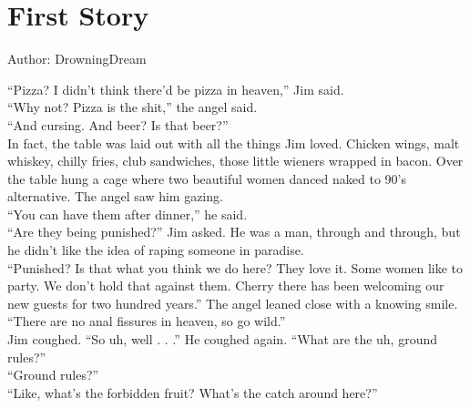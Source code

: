 \chapter{First Story}

Author: DrowningDream

\enquote{Pizza?  I didn't think there'd be pizza in heaven,} Jim said.\\

\enquote{Why not?  Pizza is the shit,} the angel said.\\



\enquote{And cursing.  And beer?  Is that beer?}\\



In fact, the table was laid out with all the things Jim loved.  Chicken wings, malt whiskey, chilly fries, club sandwiches, those little wieners wrapped in bacon.  Over the table hung a cage where two beautiful women danced naked to 90's alternative.  The angel saw him gazing.\\



\enquote{You can have them after dinner,} he said.  \\



\enquote{Are they being punished?} Jim asked.  He was a man, through and through, but he didn't like the idea of raping someone in paradise.\\



\enquote{Punished?  Is that what you think we do here?  They love it.  Some women like to party.  We don't hold that against them.  Cherry there has been welcoming our new guests for two hundred years.}  The angel leaned close with a knowing smile.  \enquote{There are no anal fissures in heaven, so go wild.}\\



Jim coughed.  \enquote{So uh, well . . .}  He coughed again.  \enquote{What are the uh, ground rules?}\\



\enquote{Ground rules?}\\



\enquote{Like, what's the forbidden fruit?  What's the catch around here?}\\



